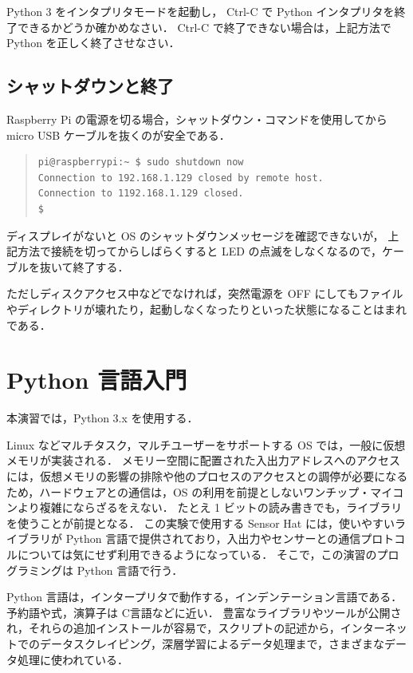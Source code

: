 \documentclass[11pt,a4,epsf]{report}
\begin{document}
\begin{excercise}
Python 3 をインタプリタモードを起動し，
Ctrl-C で Python  インタプリタを終了できるかどうか確かめなさい．
Ctrl-C で終了できない場合は，上記方法で Python を正しく終了させなさい．
\end{excercise}

\subsection{シャットダウンと終了}

Raspberry Pi の電源を切る場合，シャットダウン・コマンドを使用してから micro USB ケーブルを抜くのが安全である．
\begin{quote}
\small
\begin{verbatim}
pi@raspberrypi:~ $ sudo shutdown now
Connection to 192.168.1.129 closed by remote host.
Connection to 1192.168.1.129 closed.
$ 
\end{verbatim}
\end{quote}
ディスプレイがないと OS のシャットダウンメッセージを確認できないが，
上記方法で接続を切ってからしばらくすると LED の点滅をしなくなるので，ケーブルを抜いて終了する．

ただしディスクアクセス中などでなければ，突然電源を OFF にしてもファイルやディレクトリが壊れたり，起動しなくなったりといった状態になることはまれである．



\section{Python 言語入門}

本演習では，Python 3.x を使用する．

Linux などマルチタスク，マルチユーザーをサポートする OS では，一般に仮想メモリが実装される．
メモリー空間に配置された入出力アドレスへのアクセスには，仮想メモリの影響の排除や他のプロセスのアクセスとの調停が必要になるため，ハードウェアとの通信は，OS の利用を前提としないワンチップ・マイコンより複雑にならざるをえない．
たとえ 1 ビットの読み書きでも，ライブラリを使うことが前提となる．
この実験で使用する Sensor Hat には，使いやすいライブラリが Python 言語で提供されており，入出力やセンサーとの通信プロトコルについては気にせず利用できるようになっている．
そこで，この演習のプログラミングは Python 言語で行う．

Python 言語は，インタープリタで動作する，インデンテーション言語である．
予約語や式，演算子は C言語などに近い．
豊富なライブラリやツールが公開され，それらの追加インストールが容易で，スクリプトの記述から，インターネットでのデータスクレイピング，深層学習によるデータ処理まで，さまざまなデータ処理に使われている．
\end{document}
